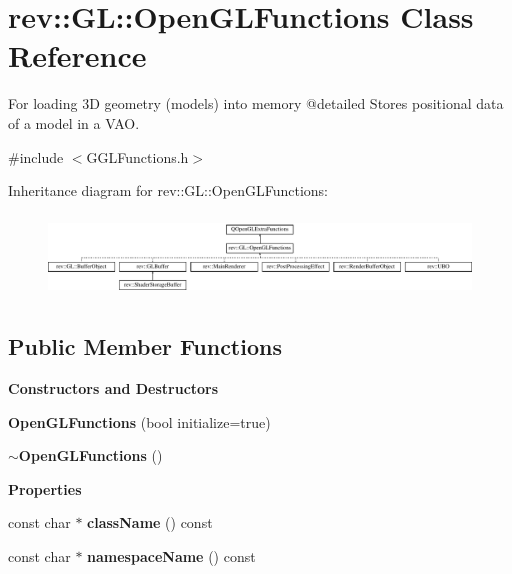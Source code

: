 \hypertarget{classrev_1_1_g_l_1_1_open_g_l_functions}{}\section{rev\+::GL\+::Open\+G\+L\+Functions Class Reference}
\label{classrev_1_1_g_l_1_1_open_g_l_functions}


For loading 3D geometry (models) into memory @detailed Stores positional data of a model in a V\+AO.  




{\ttfamily \#include $<$G\+G\+L\+Functions.\+h$>$}

Inheritance diagram for rev\+::GL\+::Open\+G\+L\+Functions\+:\begin{figure}[H]
\begin{center}
\leavevmode
\includegraphics[height=2.209073cm]{classrev_1_1_g_l_1_1_open_g_l_functions}
\end{center}
\end{figure}
\subsection*{Public Member Functions}
\begin{Indent}\textbf{ Constructors and Destructors}\par
\begin{DoxyCompactItemize}
\item 
\mbox{\label{classrev_1_1_g_l_1_1_open_g_l_functions_ad12d7da8c6f1e7e13ca8e45b8d4d6144}} 
{\bfseries Open\+G\+L\+Functions} (bool initialize=true)
\item 
\mbox{\label{classrev_1_1_g_l_1_1_open_g_l_functions_afb86c8d9e273ff260b85079e13c6fc44}} 
{\bfseries $\sim$\+Open\+G\+L\+Functions} ()
\end{DoxyCompactItemize}
\end{Indent}
\begin{Indent}\textbf{ Properties}\par
\begin{DoxyCompactItemize}
\item 
\mbox{\label{classrev_1_1_g_l_1_1_open_g_l_functions_aee43f28d165e15c781f259f9928337d5}} 
const char $\ast$ {\bfseries class\+Name} () const
\item 
\mbox{\label{classrev_1_1_g_l_1_1_open_g_l_functions_accae603a3400762ae4966f3c07c5e613}} 
const char $\ast$ {\bfseries namespace\+Name} () const
\end{DoxyCompactItemize}
\end{Indent}
